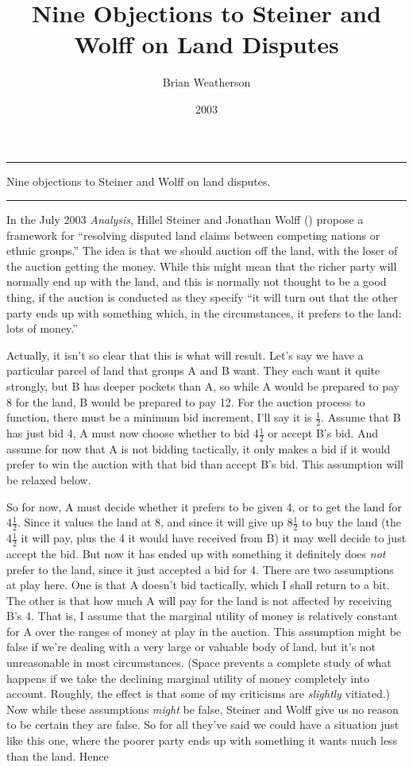 \documentclass[
  10pt,
  letterpaper,
  DIV=11,
  numbers=noendperiod,
  twoside]{scrartcl}
\title{Nine Objections to Steiner and Wolff on Land Disputes}
\author{Brian Weatherson}
\date{2003}
\renewenvironment{abstract}
 {\vspace{-1.25cm}
 \quotation\small\noindent\rule{\linewidth}{.5pt}\par\smallskip
 \noindent }
 {\par\noindent\rule{\linewidth}{.5pt}\endquotation}
\begin{document}
\maketitle
\begin{abstract}
Nine objections to Steiner and Wolff on land disputes.
\end{abstract}

In the July 2003 \emph{Analysis}, Hillel Steiner and Jonathan Wolff
() propose a framework for ``resolving
disputed land claims between competing nations or ethnic groups.'' The
idea is that we should auction off the land, with the loser of the
auction getting the money. While this might mean that the richer party
will normally end up with the land, and this is normally not thought to
be a good thing, if the auction is conducted as they specify ``it will
turn out that the other party ends up with something which, in the
circumstances, it prefers to the land: lots of money.''

Actually, it isn't so clear that this is what will result. Let's say we
have a particular parcel of land that groups A and B want. They each
want it quite strongly, but B has deeper pockets than A, so while A
would be prepared to pay 8 for the land, B would be prepared to pay 12.
For the auction process to function, there must be a minimum bid
increment, I'll say it is \(\frac{1}{2}\). Assume that B has just bid 4,
A must now choose whether to bid 4\(\frac{1}{2}\) or accept B's bid. And
assume for now that A is not bidding tactically, it only makes a bid if
it would prefer to win the auction with that bid than accept B's bid.
This assumption will be relaxed below.

So for now, A must decide whether it prefers to be given 4, or to get
the land for 4\(\frac{1}{2}\). Since it values the land at 8, and since
it will give up 8\(\frac{1}{2}\) to buy the land (the 4\(\frac{1}{2}\)
it will pay, plus the 4 it would have received from B) it may well
decide to just accept the bid. But now it has ended up with something it
definitely does \emph{not} prefer to the land, since it just accepted a
bid for 4. There are two assumptions at play here. One is that A doesn't
bid tactically, which I shall return to a bit. The other is that how
much A will pay for the land is not affected by receiving B's 4. That
is, I assume that the marginal utility of money is relatively constant
for A over the ranges of money at play in the auction. This assumption
might be false if we're dealing with a very large or valuable body of
land, but it's not unreasonable in most circumstances. (Space prevents a
complete study of what happens if we take the declining marginal utility
of money completely into account. Roughly, the effect is that some of my
criticisms are \emph{slightly} vitiated.) Now while these assumptions
\emph{might} be false, Steiner and Wolff give us no reason to be certain
they are false. So for all they've said we could have a situation just
like this one, where the poorer party ends up with something it wants
much less than the land. Hence
\end{document}
